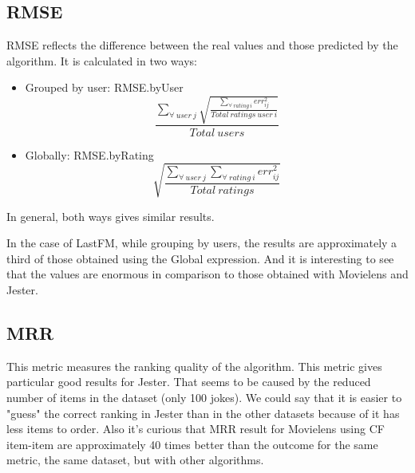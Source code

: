 \documentclass[a4paper]{article}
\begin{document}
\subsection{RMSE}
RMSE reflects the difference between the real values and those predicted by the algorithm.
It is calculated in two ways:
\begin{itemize}
	\item Grouped by user: RMSE.byUser
	\begin{equation}
		\frac{\displaystyle\sum_{\forall\ user\ j}\sqrt{\frac{\displaystyle\sum_{\forall\ rating\ i} err_{ij}^2}{Total\ ratings\ user\ i}}}{Total\ users}
    \end{equation}
    \item Globally: RMSE.byRating 
	\begin{equation}
		\sqrt{\frac{\displaystyle\sum_{\forall\ user\ j}\displaystyle\sum_{\forall\ rating\ i} err_{ij}^2}{Total\ ratings}}
    \end{equation}
\end {itemize}

In general, both ways gives similar results.

In the case of LastFM, while grouping by users, the results are approximately a third of those obtained using the Global expression. And it is interesting to see that the values are enormous in comparison to those obtained with Movielens and Jester.


\subsection{MRR}
This metric measures the ranking quality of the algorithm.
This metric gives particular good results for Jester. That seems to be caused by the reduced number of items in the dataset (only 100 jokes). We could say that it is easier to "guess" the correct ranking in Jester than in the other datasets because of it has less items to order.
Also it's curious that MRR result for Movielens using CF item-item are approximately 40 times better than the outcome for the same metric, the same dataset, but with other algorithms.

\end{document}
